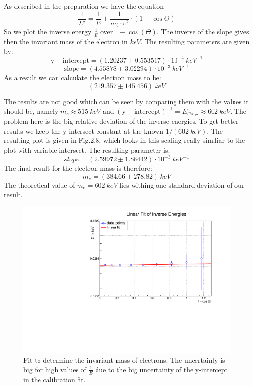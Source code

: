 As described in the preparation we have the equation
$$\frac{1}{E'} = \frac{1}{E} + \frac{1}{m_0 \cdot c^{2}} \cdot (1 - \cos \Theta) $$
So we plot the inverse energy $\frac{1}{E}$ over $1 - \cos(\Theta)$. The inverse of the slope gives then the invariant mass of the electron in $keV$. The resulting parameters are given by:
$$\mathrm{y-intercept} = (1.20237 \pm 0.553517) \cdot 10^{-4} \ keV^{-1}$$
$$\mathrm{slope} =  (4.55878 \pm 3.02294) \cdot 10^{-3} \ keV^{-1}$$
As a result we can calculate the electron mass to be:
$$(219.357 \pm 145.456) \ keV$$

The results are not good which can be seen by comparing them with the values it should be, namely $m_e \approx 515 \ keV$ and $(\mathrm{y-intercept})^{-1} = E_{Cs_137} \approx 602 \ keV$. The problem here is the big relative deviation of the inverse energies. To get better results we keep the y-intersect constant at the known $1/(602 \ keV)$. The resulting plot is given in Fig.2.8, which looks in this scaling really similiar to the plot with variable intersect. The resulting parameter is:
$$slope = (2.59972 \pm 1.88442) \cdot 10^{-3} \ keV^{-1}$$
The final result for the electron mass is therefore:
$$m_e = (384.66 \pm  278.82) \ keV$$
The theoretical value of $m_e = 602 \ keV$ lies withing one standard deviation of our result.



\newpage

\begin{figure}
\centering
\includegraphics[scale=0.5]{./../plots/inv_el_mass.pdf}
\caption{Fit to determine the invariant mass of electrons. The uncertainty is big for high values of $\frac{1}{E}$ due to the big uncertainty of the y-intercept in the calibration fit.}
\end{figure}


